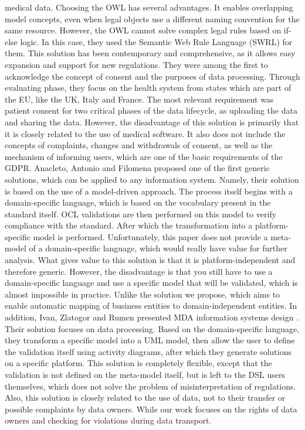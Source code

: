 \documentclass[11pt,english]{article}
\begin{document}
medical data. Choosing the OWL has several advantages. It enables overlapping model concepts, even when legal objects use a different naming convention for the same resource. However, the OWL cannot solve complex legal rules based on if-else logic. In this case, they used the Semantic Web Rule Language (SWRL) \cite{swrl} for them. This solution has been contemporary and comprehensive, as it allows easy expansion and support for new regulations. They were among the first to acknowledge the concept of consent and the purposes of data processing. Through evaluating phase, they focus on the health system from states which are part of the EU, like the UK, Italy and France. The most relevant requirement was patient consent for two critical phases of the data lifecycle, as uploading the data and sharing the data. However, the disadvantage of this solution is primarily that it is closely related to the use of medical software. It also does not include the concepts of complaints, changes and withdrawals of consent, as well as the mechanism of informing users, which are one of the basic requirements of the GDPR. \newline  Anacleto, Antonio and Filomena \cite{correia2017model} proposed one of the first generic solutions, which can be applied to any information system. Namely, their solution is based on the use of a model-driven approach. The process itself begins with a domain-specific language, which is based on the vocabulary present in the standard itself. OCL validations are then performed on this model to verify compliance with the standard. After which the transformation into a platform-specific model is performed. Unfortunately, this paper does not provide a meta-model of a domain-specific language, which would really have value for further analysis. What gives value to this solution is that it is platform-independent and therefore generic. However, the disadvantage is that you still have to use a domain-specific language and use a specific model that will be validated, which is almost impossible in practice. Unlike the solution we propose, which aims to enable automatic mapping of business entities to domain-independent entities. In addition, Ivan, Zlatogor and Rumen presented MDA information systems design \cite{gaidarskimodel}. Their solution focuses on data processing. Based on the domain-specific language, they transform a specific model into a UML model, then allow the user to define the validation itself using activity diagrams, after which they generate solutions on a specific platform. This solution is completely flexible, except that the validation is not defined on the meta-model itself, but is left to the DSL users themselves, which does not solve the problem of misinterpretation of regulations. Also, this solution is closely related to the use of data, not to their transfer or possible complaints by data owners. While our work focuses on the rights of data owners and checking for violations during data transport.
\end{document}
